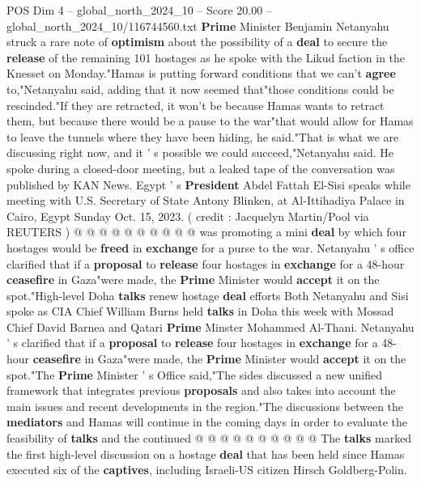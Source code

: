 \begin{textsample}{POS Dim 4 – global\_north\_2024\_10 – Score 20.00 – global\_north\_2024\_10/116744560.txt}  \label{ex:f4_pos_402}
\textbf{Prime} Minister Benjamin Netanyahu struck a rare note of \textbf{optimism} about the possibility of a \textbf{deal} to secure the \textbf{release} of the remaining 101 hostages as he spoke with the Likud faction in the Knesset on Monday."Hamas is putting forward conditions that we can't \textbf{agree} to,"Netanyahu said, adding that it now seemed that"those conditions could be rescinded."If they are retracted, it won't be because Hamas wants to retract them, but because there would be a pause to the war"that would allow for Hamas to leave the tunnels where they have been hiding, he said."That is what we are discussing right now, and it ' s possible we could succeed,"Netanyahu said.
He spoke during a closed-door meeting, but a leaked tape of the conversation was published by KAN News.
Egypt ' s \textbf{President} Abdel Fattah El-Sisi speaks while meeting with U.S.
Secretary of State Antony Blinken, at Al-Ittihadiya Palace in Cairo, Egypt Sunday Oct. 15, 2023. ( credit : Jacquelyn Martin/Pool via REUTERS ) @ @ @ @ @ @ @ @ @ @ was promoting a mini \textbf{deal} by which four hostages would be \textbf{freed} in \textbf{exchange} for a purse to the war.
Netanyahu ' s office clarified that if a \textbf{proposal} to \textbf{release} four hostages in \textbf{exchange} for a 48-hour \textbf{ceasefire} in Gaza"were made, the \textbf{Prime} Minister would \textbf{accept} it on the spot."High-level Doha \textbf{talks} renew hostage \textbf{deal} efforts Both Netanyahu and Sisi spoke as CIA Chief William Burns held \textbf{talks} in Doha this week with Mossad Chief David Barnea and Qatari \textbf{Prime} Minster Mohammed Al-Thani.
Netanyahu ' s clarified that if a \textbf{proposal} to \textbf{release} four hostages in \textbf{exchange} for a 48-hour \textbf{ceasefire} in Gaza"were made, the \textbf{Prime} Minister would \textbf{accept} it on the spot."The \textbf{Prime} Minister ' s Office said,"The sides discussed a new unified framework that integrates previous \textbf{proposals} and also takes into account the main issues and recent developments in the region."The discussions between the \textbf{mediators} and Hamas will continue in the coming days in order to evaluate the feasibility of \textbf{talks} and the continued @ @ @ @ @ @ @ @ @ @ The \textbf{talks} marked the first high-level discussion on a hostage \textbf{deal} that has been held since Hamas executed six of the \textbf{captives}, including Israeli-US citizen Hirsch Goldberg-Polin.

\end{textsample}

